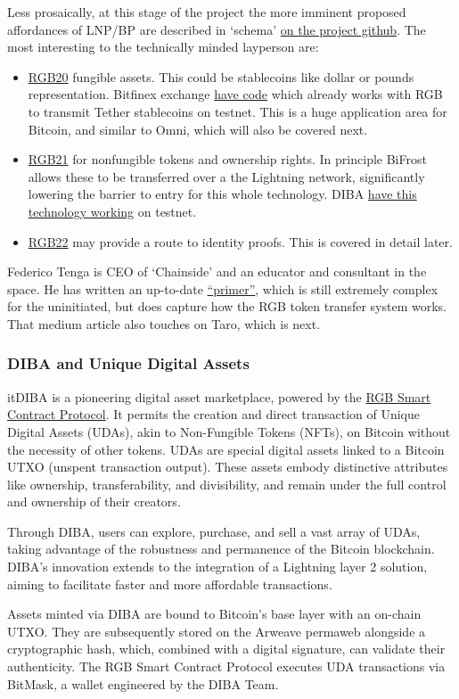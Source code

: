Less prosaically, at this stage of the project the more imminent proposed affordances of LNP/BP are described in `schema' \href{https://github.com/LNP-BP/LNPBPs}{on the project github}. The most interesting to the technically minded layperson are:
\begin{itemize}
\item \href{https://github.com/LNP-BP/LNPBPs/blob/master/lnpbp-0020.md}{RGB20} fungible assets. This could be stablecoins like dollar or pounds representation. Bitfinex exchange \href{https://github.com/RGB-Tools/rgb-lightning-sample}{have code} which already works with RGB to transmit Tether stablecoins on testnet. This is a huge application area for Bitcoin, and similar to Omni, which will also be covered next.
\item \href{https://github.com/LNP-BP/LNPBPs/blob/master/lnpbp-0021.md}{RGB21} for nonfungible tokens and ownership rights. In principle BiFrost allows these to be transferred over a the Lightning network, significantly lowering the barrier to entry for this whole technology. DIBA \href{https://diba.io/}{have this technology working} on testnet.
\item \href{https://github.com/LNP-BP/LNPBPs/issues/29}{RGB22} may provide a route to identity proofs. This is covered in detail later.
\end{itemize}
Federico Tenga is CEO of `Chainside' and an educator and consultant in the space. He has written an up-to-date \href{https://medium.com/@FedericoTenga/understanding-rgb-protocol-7dc7819d3059}{``primer''}, which is still extremely complex for the uninitiated, but does capture how the RGB token transfer system works. That medium article also touches on Taro, which is next.
\subsubsection{DIBA and Unique Digital Assets}
it{DIBA} is a pioneering digital asset marketplace, powered by the \href{https://www.rgb.tech/}{RGB Smart Contract Protocol}. It permits the creation and direct transaction of Unique Digital Assets (UDAs), akin to Non-Fungible Tokens (NFTs), on Bitcoin without the necessity of other tokens. UDAs are special digital assets linked to a Bitcoin UTXO (unspent transaction output). These assets embody distinctive attributes like ownership, transferability, and divisibility, and remain under the full control and ownership of their creators.\par
Through DIBA, users can explore, purchase, and sell a vast array of UDAs, taking advantage of the robustness and permanence of the Bitcoin blockchain. DIBA's innovation extends to the integration of a Lightning layer 2 solution, aiming to facilitate faster and more affordable transactions.\par
Assets minted via DIBA are bound to Bitcoin's base layer with an on-chain UTXO. They are subsequently stored on the Arweave permaweb alongside a cryptographic hash, which, combined with a digital signature, can validate their authenticity. The RGB Smart Contract Protocol executes UDA transactions via BitMask, a wallet engineered by the DIBA Team.
